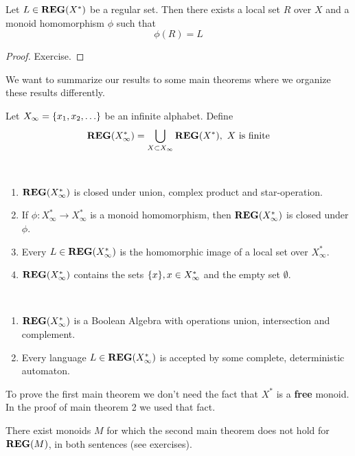 \bigskip
\begin{lemma}
Let $L \in \mbox{{\bf REG}}(X^*)$ be a regular set. Then there exists a local set
$R$ over $X$ and a monoid homomorphism $\phi$ such that \[ \phi(R) = L \]
\end{lemma}

\begin{proof}
Exercise.
\end{proof}

\bigskip
We want to summarize our results to some main theorems where we organize these
results differently.

Let $X_\infty = \mbox{$\{x_1, x_2, \ldots\}$}$ be an infinite alphabet. Define 
\[ \mbox{{\bf REG}}(X_\infty^*) = \bigcup_{X \subset X_\infty} \mbox{{\bf REG}}(X^*),\ X
	\text{ is finite} \]

\bigskip
\begin{maintheorem}\ 

\begin{enumerate}
  \item $\mbox{{\bf REG}}(X_\infty^*)$ is closed under union, complex product and
  star-operation.
  \item If $\phi : X_\infty^* \to X_\infty^*$ is a monoid homomorphism, then
$\mbox{{\bf REG}}(X_\infty^*)$ is closed under $\phi$.
	\item Every $L \in \mbox{{\bf REG}}(X_\infty^*)$ is the homomorphic image of a local set
	over $X_\infty^*$.
	\item $\mbox{{\bf REG}}(X_\infty^*)$	 contains the sets $\mbox{$\{x\}$}, x \in X_\infty^*$ and
	the empty set $\emptyset$.
\end{enumerate}
\end{maintheorem}

\bigskip
\begin{maintheorem}\ 

\begin{enumerate}
  \item $\mbox{{\bf REG}}(X_\infty^*)$ is a Boolean Algebra with operations union, 
  intersection and complement. 
	\item Every language $L \in \mbox{{\bf REG}}(X_\infty^*)$ is accepted by some complete,
deterministic automaton.
\end{enumerate}
\end{maintheorem}

To prove the first main theorem we don't need the fact that $X^*$ is a {\bf
free} monoid. In the proof of main theorem 2 we used that fact.

There exist monoids $M$ for which the second main theorem does not
hold for $\mbox{{\bf REG}}(M)$, in both sentences (see exercises).


